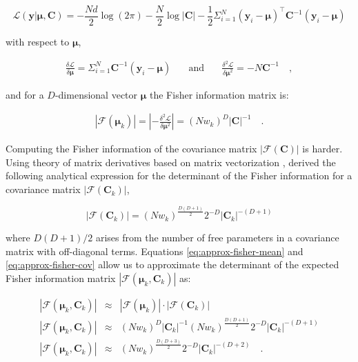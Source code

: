 \documentclass{aastex61}
\newcommand{\vect}[1]{\boldsymbol{\mathbf{#1}}}
\def\veccov{\vect{C}}
\def\vecmean{\vect{\mu}}
\def\weight{w}
\def\datum{y}
\def\data{\vect{\datum}}
\def\likelihood{\mathcal{L}}
\begin{document}
\begin{equation}
  \likelihood\left(\data|\vecmean, \veccov\right) = 
  -\frac{Nd}{2}\log{\left(2\pi\right)} - \frac{N}{2}\log{|\veccov|} - \frac{1}{2}\Sigma_{i=1}^{N}\left(\data_i - \vecmean\right)^\intercal{}\veccov^{-1}\left(\bm{y}_i - \vecmean\right)
\end{equation}

\noindent{}with respect to $\vecmean$,

\begin{eqnarray}
  \frac{\delta\likelihood}{\delta\vecmean} = \Sigma_{i=1}^{N}\veccov^{-1}(\data_i - \vecmean)
  & \hspace{1em}\textrm{and}\hspace{1em}
  & \frac{\delta^2\likelihood}{\delta\vecmean^2} = -N\veccov^{-1} \quad ,
\end{eqnarray}

\noindent{}and for a $D$-dimensional vector $\vecmean$ the Fisher information
matrix is:

\begin{eqnarray}
    |\mathcal{F}(\vecmean_k)| = \left|-\frac{\delta^2\likelihood}{\delta\vecmean^2}\right| = (N\weight_k)^D|\veccov|^{-1} \quad .
  \label{eq:approx-fisher-mean}
\end{eqnarray}

Computing the Fisher information of the covariance matrix 
$|\mathcal{F}\left(\veccov\right)|$ is harder.
Using theory of matrix derivatives based on matrix vectorization \citep{Dwyer_1967},
\citet{Magnus_1988} derived the following analytical expression for the 
determinant of the Fisher information for a covariance matrix
$|\mathcal{F}\left(\veccov_k\right)|$,


\begin{equation}
    |\mathcal{F}\left(\veccov_k\right)| = (N\weight_k)^\frac{D(D+1)}{2}2^{-D}|\veccov_k|^{-(D+1)}
  \label{eq:approx-fisher-cov}
\end{equation}

\noindent{}where $D(D+1)/2$ arises from the number of free parameters in a
covariance matrix with off-diagonal terms.
Equations \ref{eq:approx-fisher-mean} and \ref{eq:approx-fisher-cov} allow us
to approximate the determinant of the expected Fisher information matrix
$|\mathcal{F}\left(\vecmean_k,\veccov_k\right)|$ as:

\begin{eqnarray}
  |\mathcal{F}\left(\vecmean_k,\veccov_k\right)| & \approx & |\mathcal{F}\left(\vecmean_k\right)|\cdot|\mathcal{F}\left(\veccov_k\right)| \nonumber \\
    |\mathcal{F}\left(\vecmean_k,\veccov_k\right)| & \approx & (N\weight_k)^{D}|\veccov_k|^{-1}(N\weight_k)^\frac{D(D+1)}{2}2^{-D}|\veccov_k|^{-(D+1)} \nonumber \\
    |\mathcal{F}\left(\vecmean_k,\veccov_k\right)| & \approx & (N\weight_k)^\frac{D(D+3)}{2}2^{-D}|\veccov_k|^{-(D+2)} \quad .
  \label{eq:fisher-mean-cov}
\end{eqnarray}
\end{document}

